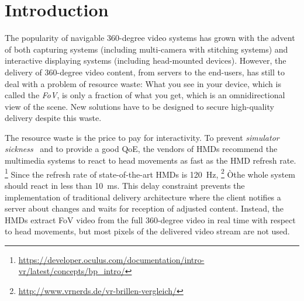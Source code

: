 \section{Introduction}
\label{sec:introduction}


The popularity of navigable 360-degree video systems
has grown with the advent of both capturing systems
(including multi-camera with stitching systems) and interactive displaying
systems (including head-mounted devices).
However, the delivery of 360-degree video content, from servers
to the end-users,
has still to deal with a problem of resource waste: What you see in your device, 
which is called the \textit{\ac{FoV}},
is only a fraction of what you get, which is an omnidirectional view of the scene.
New solutions have to be designed to secure high-quality delivery despite
this waste.

The resource waste is the price to pay for interactivity.
To prevent \emph{simulator sickness}~\cite{moss2011characteristics}
and to provide a good \ac{QoE}, the vendors of \acp{HMD} recommend the multimedia 
systems to react
to head movements as fast as the \ac{HMD}
refresh rate.%
\footnote{\url{https://developer.oculus.com/documentation/intro-vr/latest/concepts/bp_intro/}}
Since the refresh rate of 
state-of-the-art \acp{HMD} is \SI{120}{Hz},%
\footnote{\url{http://www.vrnerds.de/vr-brillen-vergleich/}}
Òthe whole system should react in less than
\SI{10}{ms}. This delay constraint prevents the implementation of traditional delivery
architecture where the client notifies a server about changes and waits for reception
of adjusted content. Instead, the \acp{HMD} extract \ac{FoV} video from the full
360-degree video in real time with respect to head movements, but most pixels
of the delivered video stream are not used.


